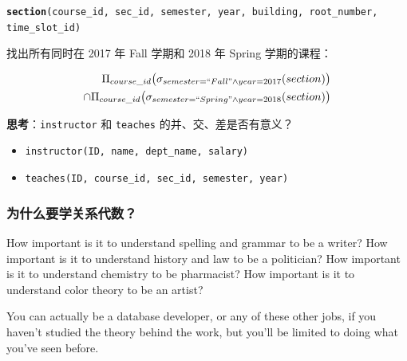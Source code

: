 \documentclass[aspectratio=169, 14pt]{beamer}
\begin{document}
\begin{frame}
    \texttt{\textbf{section}(course\_id, sec\_id, semester, year, building, root\_number, time\_slot\_id)}
    
        找出所有同时在 2017 年 Fall 学期和 2018 年 Spring 学期的课程：
        
        \begin{equation*}
            \begin{split}
                \Pi_{course\_id}\bigl(\sigma_{semester=``Fall" \land year=2017}(section)\bigr) \\ \cap
                \Pi_{course\_id}\bigl(\sigma_{semester=``Spring" \land year=2018}(section)\bigr)
            \end{split}
        \end{equation*}
    
\end{frame}

\begin{frame}
    \textbf{思考}：\texttt{instructor} 和 \texttt{teaches} 的并、交、差是否有意义？ 

    \begin{itemize}
        \item \texttt{instructor(ID, name, dept\_name, salary)}
        \item \texttt{teaches(ID, course\_id, sec\_id, semester, year)}
    \end{itemize}  
\pause
{} 
\end{frame}

\begin{frame}
    \frametitle{为什么要学关系代数？}    
    How important is it to understand spelling and grammar to be a writer? How important is it to understand history and law to be a politician? How important is it to understand chemistry to be pharmacist? How important is it to understand color theory to be an artist?

    You can actually be a database developer, or any of these other jobs, if you haven't studied the theory behind the work, but you'll be limited to doing what you've seen before.

\end{frame}
\end{document}
